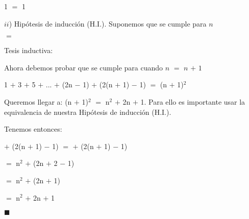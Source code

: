 \documentclass[12pt]{article}
\renewcommand{\qedsymbol}{$\blacksquare$}
\begin{document}
\hspace{6.3cm} 1 $=$ 1 

\newpage

 {\textcolor{verde_manzana}{$ii$) Hipótesis de inducción (H.I.). }} Suponemos que se cumple para $n$\vspace{0.2cm} 
 
\hspace{4cm} {} $=$  {} \vspace{0.2cm}
 
{\textcolor{verde_manzana}{Tesis inductiva:}}  \vspace{0.2cm}
 
Ahora debemos probar que se cumple para cuando $n$ $=$ $n$ $+$ $1$ \vspace{0.2cm}
 
\hspace{2cm} 1 $+$ 3 $+$ 5 $+$ $...$ $+$ (2n $-$ 1) $+$ (2(n $+$ 1) $-$ 1) $=$ (n $+$ 1)$^{2}$ \vspace{0.2cm} 

Queremos llegar a: (n $+$ 1)$^{2}$ $=$ n$^{2}$ $+$ 2n $+$ 1. Para ello es importante usar la equivalencia de nuestra {\textcolor{verde_manzana}{Hipótesis de inducción (H.I.). }}  \vspace{0.2cm}

Tenemos entonces: \vspace{0.5cm}

\hspace{1cm} {\textcolor{verde_manzana}{}}  $+$ (2(n $+$ 1) $-$ 1) $=$ {\textcolor{verde_manzana}{}} $+$ (2(n $+$ 1) $-$ 1) \vspace{0.2cm}

\hspace{10.98cm} $=$ n$^{2}$ $+$ (2n $+$ 2 $-$ 1) \vspace{0.2cm}

\hspace{10.98cm} $=$ n$^{2}$ $+$ (2n $+$ 1) \vspace{0.2cm}

\hspace{10.98cm} $=$ n$^{2}$ $+$ 2n $+$ 1 \vspace{0.2cm}
 
\hspace{11.5cm} \qedsymbol \vspace{0.5cm}

\end{document}
